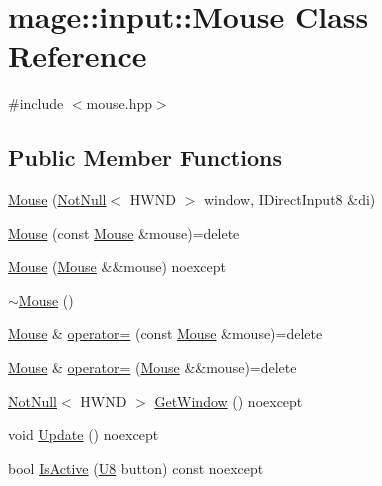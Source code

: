 \hypertarget{classmage_1_1input_1_1_mouse}{}\section{mage\+:\+:input\+:\+:Mouse Class Reference}
\label{classmage_1_1input_1_1_mouse}


{\ttfamily \#include $<$mouse.\+hpp$>$}

\subsection*{Public Member Functions}
\begin{DoxyCompactItemize}
\item 
\mbox{\hyperlink{classmage_1_1input_1_1_mouse_add3fd231e5af4f3669eaa8d5f8d157ec}{Mouse}} (\mbox{\hyperlink{namespacemage_a8769f9d670d6b585ea306cb1062af94b}{Not\+Null}}$<$ H\+W\+ND $>$ window, I\+Direct\+Input8 \&di)
\item 
\mbox{\hyperlink{classmage_1_1input_1_1_mouse_a4f560bb3a59f6cee57e7cd03b24ef218}{Mouse}} (const \mbox{\hyperlink{classmage_1_1input_1_1_mouse}{Mouse}} \&mouse)=delete
\item 
\mbox{\hyperlink{classmage_1_1input_1_1_mouse_a6e8185b9b2f0fdcd63a191389eb2b050}{Mouse}} (\mbox{\hyperlink{classmage_1_1input_1_1_mouse}{Mouse}} \&\&mouse) noexcept
\item 
\mbox{\hyperlink{classmage_1_1input_1_1_mouse_abfc6391c896b029e38ffa1341dcf9963}{$\sim$\+Mouse}} ()
\item 
\mbox{\hyperlink{classmage_1_1input_1_1_mouse}{Mouse}} \& \mbox{\hyperlink{classmage_1_1input_1_1_mouse_af4ce64a7808af28c80bc9c01c83f7d14}{operator=}} (const \mbox{\hyperlink{classmage_1_1input_1_1_mouse}{Mouse}} \&mouse)=delete
\item 
\mbox{\hyperlink{classmage_1_1input_1_1_mouse}{Mouse}} \& \mbox{\hyperlink{classmage_1_1input_1_1_mouse_a05d2471a4f517cc1970df352e7a68724}{operator=}} (\mbox{\hyperlink{classmage_1_1input_1_1_mouse}{Mouse}} \&\&mouse)=delete
\item 
\mbox{\hyperlink{namespacemage_a8769f9d670d6b585ea306cb1062af94b}{Not\+Null}}$<$ H\+W\+ND $>$ \mbox{\hyperlink{classmage_1_1input_1_1_mouse_a5fd893af2aede58106b718448e7e0dde}{Get\+Window}} () noexcept
\item 
void \mbox{\hyperlink{classmage_1_1input_1_1_mouse_aa4eb9865206c2b946f8d21106d378907}{Update}} () noexcept
\item 
bool \mbox{\hyperlink{classmage_1_1input_1_1_mouse_a071d1e562f177efcc09b9e60aaf4f378}{Is\+Active}} (\mbox{\hyperlink{namespacemage_a30677c03d683c4c35630c25f6ff3fb7f}{U8}} button) const noexcept

\end{DoxyCompactItemize}

